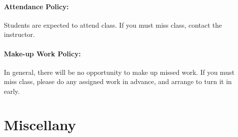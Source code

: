 \documentclass[12pt, letterpaper]{article}
\begin{document}
\paragraph{Attendance Policy:}
Students are expected to attend class. If you must miss class, contact the instructor.

\paragraph{Make-up Work Policy:}
In general, there will be no opportunity to make up missed work. If you must miss class, please do any assigned work in advance, and arrange to turn it in early.

\section*{Miscellany}
\end{document}
